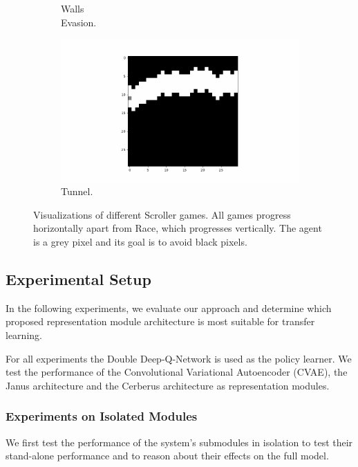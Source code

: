 \begin{figure}[ht!]
\begin{subfigure}{0.24\columnwidth}
		\caption{Walls \\ Evasion.}
		\label{subfig:wall_evasion}
	\end{subfigure}%
	\begin{subfigure}{0.24\columnwidth}
		\centering
		\includegraphics[width=\linewidth,trim={9cm 0 9cm 0},clip]{documentation/report/img/tunnel.png}
		\caption{Tunnel.\newline}
		\label{subfig:tunnel}
	\end{subfigure}
	\caption{Visualizations of different Scroller games. All games progress horizontally apart from Race, which progresses vertically. The agent is a grey pixel and its goal is to avoid black pixels.}
	\label{fig:scrollers}
\end{figure}

\subsection{Experimental Setup}
In the following experiments, we evaluate our approach and determine which proposed representation module architecture is most suitable for transfer learning.

For all experiments the Double Deep-Q-Network is used as the policy learner. We test the performance of the Convolutional Variational Autoencoder (CVAE), the Janus architecture and the Cerberus architecture as representation modules.

\subsubsection{Experiments on Isolated Modules}
We first test the performance of the system's submodules in isolation to test their stand-alone performance and to reason about their effects on the full model.

